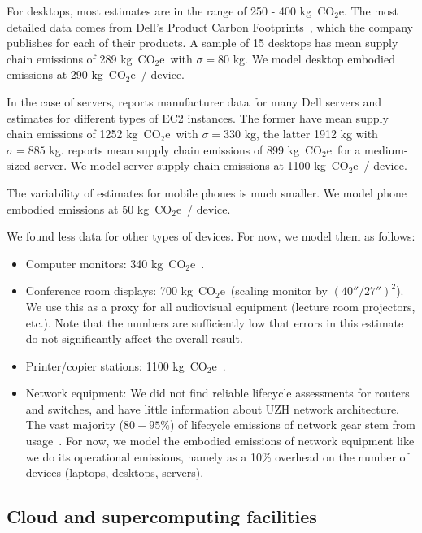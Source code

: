 \documentclass[11pt]{article}
\newcommand{\coe}{CO$_2$e}
\newcommand{\gcoe}{g~\coe}
\newcommand{\kgcoe}{k\gcoe}
\let\cite\parencite
\begin{document}
For desktops, most estimates are in the range of 250 - 400 \kgcoe. The most detailed data comes from Dell's Product Carbon Footprints~\cite{dellpcf}, which the company publishes for each of their products. A sample of 15 desktops has mean supply chain emissions of 289 \kgcoe\ with $\sigma = 80$ kg. We model desktop embodied emissions at 290 \kgcoe\ / device.

In the case of servers, \textcite{davy2021} reports manufacturer data for many Dell servers and estimates for different types of EC2 instances. The former have mean supply chain emissions of 1252 \kgcoe\ with $\sigma = 330$ kg, the latter 1912 kg with $\sigma = 885$ kg. \textcite{boavizta:api} reports mean supply chain emissions of 899 \kgcoe\ for a medium-sized server. We model server supply chain emissions at 1100 \kgcoe\ / device.

The variability of estimates for mobile phones is much smaller. We model phone embodied emissions at 50 \kgcoe\ / device.

We found less data for other types of devices. For now, we model them as follows:

\begin{itemize}
  \item Computer monitors: 340 \kgcoe~\cite{dellpcf,lovehagen2023,teehan2013}.
  \item Conference room displays: 700 \kgcoe\ (scaling monitor by $(40''/27'')^2$). We use this as a proxy for all audiovisual equipment (lecture room projectors, etc.). Note that the numbers are sufficiently low that errors in this estimate do not significantly affect the overall result.
  \item Printer/copier stations: 1100 \kgcoe~\cite{ecoinvent}.
  \item Network equipment: We did not find reliable lifecycle assessments for routers and switches, and have little information about UZH network architecture. The vast majority ($80-95\%$) of lifecycle emissions of network gear stem from usage~\cite{cisco2024,jacob2023}. For now, we model the embodied emissions of network equipment like we do its operational emissions, namely as a 10\% overhead on the number of devices (laptops, desktops, servers).
\end{itemize}

\subsection{Cloud and supercomputing facilities}
\end{document}
